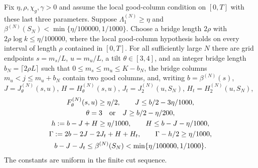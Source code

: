 \begin{lemma}\label{lem:cold-witness}
Fix $\eta,\rho,\chi_g,\gamma>0$ and assume the local good-column condition on $[0,T]$ with these last three parameters.
Suppose $\Lambda_1^{(N)}\ge\eta$ and
$\beta^{(N)}(S_N)<\min\{\eta/100000,1/1000\}$.
Choose a bridge length $2\rho$ with
$2\rho\log k\le\eta/100000$, where the local good-column hypothesis holds
on every interval of length $\rho$ contained in $[0,T]$. For all sufficiently large $N$ there
are grid endpoints $s=m_s/L$, $u=m_u/L$, a tilt $\theta\in[3,4]$, and an
integer bridge length $b_N=\lceil 2\rho L\rceil$ such that
$0\le m_s\le m_u\le K-b_N$, the bridge columns
$m_u<j\le m_u+b_N$ contain two good columns, and, writing
$b=\beta^{(N)}(s)$, $J=J_\theta^{(N)}(s,u)$,
$H=H_\theta^{(N)}(s,u)$, $J_t=J_2^{(N)}(u,S_N)$,
$H_t=H_2^{(N)}(u,S_N)$,
\begin{gather}
 F_\theta^{(N)}(s,u)\ge\eta/2,\qquad
 J\le b/2-3\eta/1000,\label{eq:repair-witness-upper}\\
 \theta=3\quad\hbox{or}\quad J\ge b/2-\eta/200,
 \label{eq:repair-witness-lower}\\
 h:=b-J+H\ge\eta/1000,\qquad H\le b-J-\eta/1000,
 \label{eq:repair-witness-geometry}\\
 \Gamma:=2b-2J-2J_t+H+H_t,\qquad
 \Gamma-h/2\ge\eta/1000,\label{eq:repair-witness-collision}\\
 b-J-J_t\le\beta^{(N)}(S_N)<\min\{\eta/100000,1/1000\}.
 \label{eq:repair-witness-mean}
\end{gather}
The constants are uniform in the finite cut sequence.
\end{lemma}


